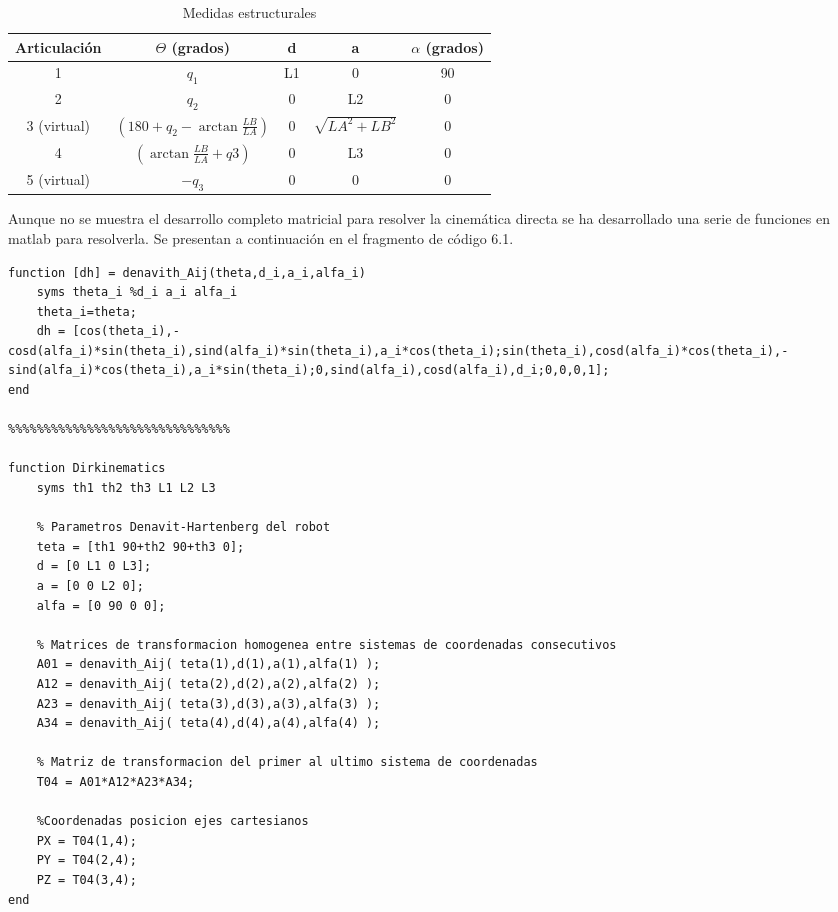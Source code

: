 	 \begin{table}[H]
	 	\caption{Medidas estructurales}
	 	\label{tab:dh}
	 	\begin{center}
	 		\begin{tabular}{ |c|c|c|c|c| }
	 			\hline
	 			Articulación & $\Theta$ (grados) & d & a & $\alpha$ (grados)\\
	 			\hline
	 			1 & $q_1$ & L1 & 0 & 90 \\
	 			\hline
	 			2 & $q_2$ & 0 & L2 & 0 \\
	 			\hline
	 			3 (virtual) & $\left(180+q_2-\arctan{\frac{LB}{LA}}\right)$ & 0 & $\sqrt{{LA}^2+{LB}^2}$ & 0 \\
	 			\hline
	 			4 & $\left(\arctan{\frac{LB}{LA}}+q3\right)$ & 0 & L3 & 0 \\
	 			\hline
	 			5 (virtual) & $-q_3$ & 0 & 0 & 0 \\
	 			\hline
	 		\end{tabular}
	 	\end{center}
	 \end{table}
	 
	 Aunque no se muestra el desarrollo completo matricial para resolver la cinemática directa se ha desarrollado una serie de funciones en matlab para resolverla. Se presentan a continuación en el fragmento de código 6.1.
	 
	 \lstset{language=matlab, breaklines=true, basicstyle=\footnotesize}
	     \begin{lstlisting}[frame=single, caption=Cálculos con DH en matlab, label=code:dhmatlab]
function [dh] = denavith_Aij(theta,d_i,a_i,alfa_i)
	syms theta_i %d_i a_i alfa_i	
	theta_i=theta;	
	dh = [cos(theta_i),-cosd(alfa_i)*sin(theta_i),sind(alfa_i)*sin(theta_i),a_i*cos(theta_i);sin(theta_i),cosd(alfa_i)*cos(theta_i),-sind(alfa_i)*cos(theta_i),a_i*sin(theta_i);0,sind(alfa_i),cosd(alfa_i),d_i;0,0,0,1];	
end

%%%%%%%%%%%%%%%%%%%%%%%%%%%%%%%

function Dirkinematics	
	syms th1 th2 th3 L1 L2 L3	
	
	% Parametros Denavit-Hartenberg del robot	
	teta = [th1 90+th2 90+th3 0];	
	d = [0 L1 0 L3];	
	a = [0 0 L2 0];	
	alfa = [0 90 0 0];	
	
	% Matrices de transformacion homogenea entre sistemas de coordenadas consecutivos	
	A01 = denavith_Aij( teta(1),d(1),a(1),alfa(1) );	
	A12 = denavith_Aij( teta(2),d(2),a(2),alfa(2) );	
	A23 = denavith_Aij( teta(3),d(3),a(3),alfa(3) );	
	A34 = denavith_Aij( teta(4),d(4),a(4),alfa(4) );	
	
	% Matriz de transformacion del primer al ultimo sistema de coordenadas	
	T04 = A01*A12*A23*A34;
		
	%Coordenadas posicion ejes cartesianos	
	PX = T04(1,4);	
	PY = T04(2,4);	
	PZ = T04(3,4);	
end
	     \end{lstlisting}
	
